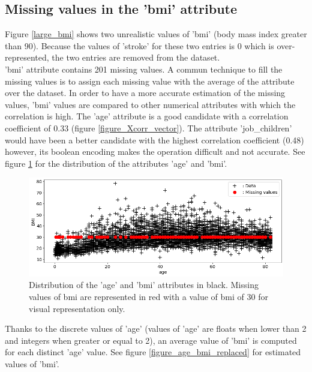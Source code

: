 \subsection{Missing values in the 'bmi' attribute}
Figure \ref{large_bmi} shows two unrealistic values of 'bmi' (body mass index greater than 90). 
Because the values of 'stroke' for these two entries is 0 which is over-represented, the two entries 
are removed from the dataset.\\

'bmi' attribute contains 201 missing values. A commun technique to fill the missing values is to 
assign each missing value with the average of the attribute over the dataset. In order to have a more 
accurate estimation of the missing values, 'bmi' values are compared to other numerical attributes 
with which the correlation is high. The 'age' attribute is a good candidate with a correlation 
coefficient of 0.33 (figure \ref{figure_Xcorr_vector}). The attribute 'job\_children' would have 
been a better candidate with the highest correlation coefficient (0.48) however, its boolean encoding 
makes the operation difficult and not accurate. See figure \ref{figure_age_bmi} for the distribution 
of the attributes 'age' and 'bmi'.   

\begin{figure}[H]
\centering
\includegraphics[scale=0.5]{../figures/plot_age_bmi_missing.png}
\caption{Distribution of the 'age' and 'bmi' attributes in black. Missing values of bmi are represented in red with a value of bmi of 30 for visual representation only.}
\label{figure_age_bmi}
\end{figure}

Thanks to the discrete values of 'age' (values of 'age' are floats when lower than 2 and integers 
when greater or equal to 2), an average value of 'bmi' is computed for each distinct 'age' value. 
See figure \ref{figure_age_bmi_replaced} for estimated values of 'bmi'. 

